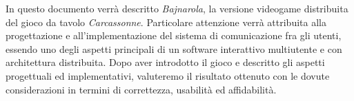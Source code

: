 In questo documento verrà descritto \emph{Bajnarola}, la versione videogame distribuita del gioco da tavolo \emph{Carcassonne}.
Particolare attenzione verrà attribuita alla progettazione e all'implementazione del sistema di comunicazione fra gli utenti,
essendo uno degli aspetti principali di un software interattivo multiutente e con architettura distribuita.
Dopo aver introdotto il gioco e descritto gli aspetti progettuali ed implementativi, 
valuteremo il risultato ottenuto con le dovute considerazioni in termini di correttezza, usabilità ed affidabilità.

